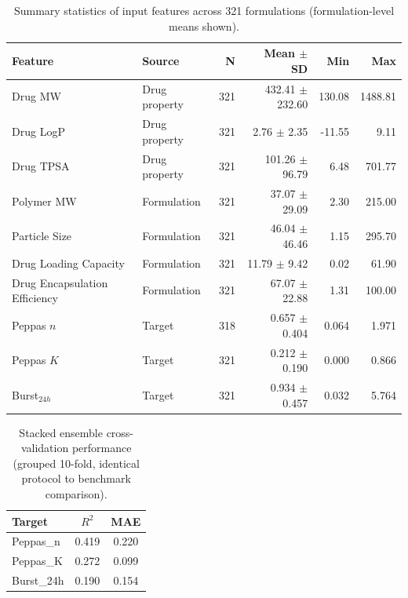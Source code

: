 
\begin{table}[ht]
\centering
\caption{Summary statistics of input features across 321 formulations (formulation-level means shown).}
\label{tab:summary_stats}
\small
\begin{tabular}{llrrrr}
\toprule
Feature & Source & N & Mean $\pm$ SD & Min & Max \\
\midrule
Drug MW & Drug property & 321 & 432.41 $\pm$ 232.60 & 130.08 & 1488.81 \\
Drug LogP & Drug property & 321 & 2.76 $\pm$ 2.35 & -11.55 & 9.11 \\
Drug TPSA & Drug property & 321 & 101.26 $\pm$ 96.79 & 6.48 & 701.77 \\
Polymer MW & Formulation & 321 & 37.07 $\pm$ 29.09 & 2.30 & 215.00 \\
Particle Size & Formulation & 321 & 46.04 $\pm$ 46.46 & 1.15 & 295.70 \\
Drug Loading Capacity & Formulation & 321 & 11.79 $\pm$ 9.42 & 0.02 & 61.90 \\
Drug Encapsulation Efficiency & Formulation & 321 & 67.07 $\pm$ 22.88 & 1.31 & 100.00 \\
\midrule
Peppas $n$ & Target & 318 & 0.657 $\pm$ 0.404 & 0.064 & 1.971 \\
Peppas $K$ & Target & 321 & 0.212 $\pm$ 0.190 & 0.000 & 0.866 \\
Burst$_{24h}$ & Target & 321 & 0.934 $\pm$ 0.457 & 0.032 & 5.764 \\
\bottomrule
\end{tabular}
\end{table}


\begin{table}[ht]
\centering
\caption{Stacked ensemble cross-validation performance (grouped 10-fold, identical protocol to benchmark comparison).}
\label{tab:cv_performance}
\begin{tabular}{lcc}
\toprule
Target & $R^2$ & MAE \\
\midrule
Peppas\_n & 0.419 & 0.220 \\
Peppas\_K & 0.272 & 0.099 \\
Burst\_24h & 0.190 & 0.154 \\
\bottomrule
\end{tabular}
\end{table}

